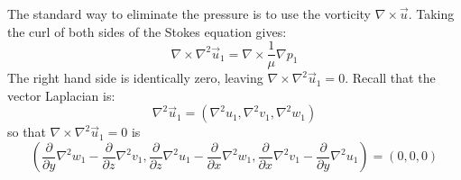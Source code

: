 \documentclass[12pt, a4paper, twoside, openright]{book}
\begin{document}
The standard way to eliminate the pressure is to use the vorticity $\nabla \times \vec{u}$.
Taking the curl of both sides of the Stokes equation gives:
\begin{equation}
\nabla \times \nabla^2 \vec{u}_1  = \nabla \times \frac{1}{\mu} \nabla p_1 
\end{equation}
The right hand side is identically zero, leaving $ \nabla \times \nabla^2 \vec{u}_1 = 0 $.
Recall that the vector Laplacian is:
\begin{equation}
\nabla^2 \vec{u}_1 = \left( \nabla^2 u_1, \nabla^2 v_1, \nabla^2 w_1 \right)
\end{equation}
so that $  \nabla \times \nabla^2 \vec{u}_1 = 0 $ is
\begin{equation}
\left( 
\frac{\partial}{\partial y} \nabla^2 w_1 - \frac{\partial}{\partial z} \nabla^2 v_1,
\frac{\partial}{\partial z} \nabla^2 u_1 - \frac{\partial}{\partial x} \nabla^2 w_1,
\frac{\partial}{\partial x} \nabla^2 v_1 - \frac{\partial}{\partial y} \nabla^2 u_1
\right) = (0,0,0)
\end{equation}
\end{document}
